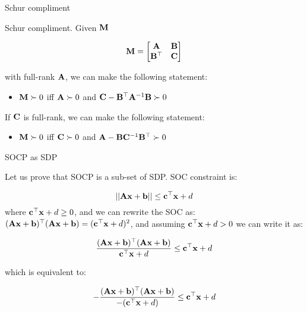 \documentclass{beamer}
\begin{document}
\begin{frame}{Schur compliment}
	\begin{flushleft}
		
		Schur compliment. Given $\mathbf{M}$
		
		\begin{equation}
			\mathbf{M} = 
			\begin{bmatrix}
				\mathbf{A} & \mathbf{B} \\
				\mathbf{B}^\top & \mathbf{C}
			\end{bmatrix}
		\end{equation}
		
		with full-rank $\mathbf{A}$, we can make the following statement:
		
		\begin{itemize}
			\item $\mathbf{M} \succ 0$ iff $\mathbf{A} \succ 0$ and $\mathbf{C} - \mathbf{B}^\top\mathbf{A}^{-1}\mathbf{B} \succ 0$
		\end{itemize}
		
		\bigskip
		
		If $\mathbf{C}$ is full-rank, we can make the following statement:
		
		\begin{itemize}
			\item $\mathbf{M} \succ 0$ iff $\mathbf{C} \succ 0$ and $\mathbf{A} - \mathbf{B}\mathbf{C}^{-1}\mathbf{B}^\top \succ 0$
		\end{itemize}		
		
		
		
	\end{flushleft}
\end{frame}



\begin{frame}{SOCP as SDP}
	\begin{flushleft}
		
		Let us prove that SOCP is a sub-set of SDP. SOC constraint is:
		
		\begin{equation}
			||\mathbf{A}\mathbf{x} + \mathbf{b}|| \leq \mathbf{c}^\top \mathbf{x} + d
		\end{equation}
		where $\mathbf{c}^\top \mathbf{x} + d \geq 0$, and we can rewrite the SOC as: $(\mathbf{A}\mathbf{x} + \mathbf{b})^\top (\mathbf{A}\mathbf{x} + \mathbf{b}) = (\mathbf{c}^\top \mathbf{x} + d)^2$, and assuming $\mathbf{c}^\top \mathbf{x} + d > 0$ we can write it as:
		
		\begin{equation}
			\frac{(\mathbf{A}\mathbf{x} + \mathbf{b})^\top (\mathbf{A}\mathbf{x} + \mathbf{b})}{\mathbf{c}^\top \mathbf{x} + d} \leq \mathbf{c}^\top \mathbf{x} + d
		\end{equation}
		
		which is equivalent to:
		
		\begin{equation}
			-\frac{(\mathbf{A}\mathbf{x} + \mathbf{b})^\top (\mathbf{A}\mathbf{x} + \mathbf{b})}{-(\mathbf{c}^\top \mathbf{x} + d)} \leq \mathbf{c}^\top \mathbf{x} + d
		\end{equation}
		
	\end{flushleft}
\end{frame}
\end{document}

